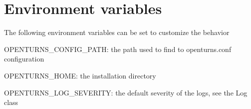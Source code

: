 \documentclass[11pt,a4paper]{article}
\begin{document}
\thispagestyle{empty}


\newpage



\tableofcontents

\newpage

\newpage
\section{Environment variables}

The following environment variables can be set to customize the behavior
\begin{description}
\item OPENTURNS\_CONFIG\_PATH: the path used to find to openturns.conf configuration
\item OPENTURNS\_HOME: the installation directory
\item OPENTURNS\_LOG\_SEVERITY: the default severity of the logs, see the Log class
\end{description}






















\ifpdf
\clearpage
{}
{}
\fi
\printindex
\end{document}
